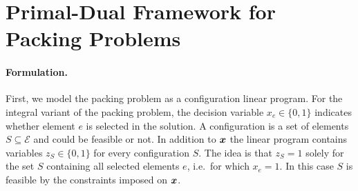 
\section{Primal-Dual Framework for Packing Problems}		\label{sec:packing}
%
%
%
%
% 


\paragraph{Formulation.}
First, we model the packing problem as a configuration linear program. 
For the integral variant of the packing problem, the decision variable $x_{e}\in\{0,1\}$  indicates whether element $e$ is selected in the solution. A configuration is a set of elements $S \subseteq \mathcal{E}$ and could be feasible or not.  In addition to $\bm{x}$ the linear program contains variables $z_S\in\{0,1\}$ for every configuration $S$. 
The idea is that $z_S=1$ solely for the set $S$ containing all selected elements $e$, i.e.\ for which $x_e=1$.  In this case $S$ is feasible by the constraints imposed on $\bm{x}$.

